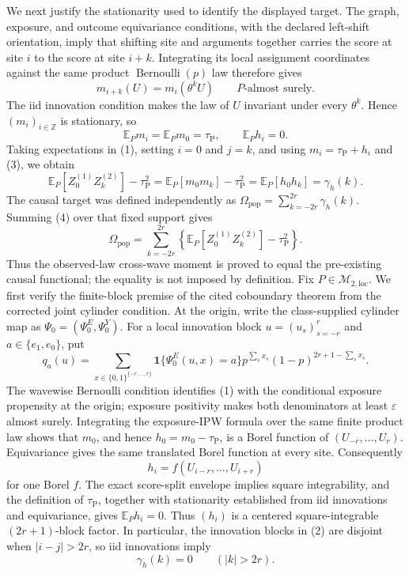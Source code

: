 We next justify the stationarity used to identify the displayed target.  The graph, exposure, and outcome equivariance conditions, with the declared left-shift orientation, imply that shifting site and arguments together carries the score at site \(i\) to the score at site \(i+k\).  Integrating its local assignment coordinates against the same product \(\operatorname{Bernoulli}(p)\) law therefore gives
\[
 m_{i+k}(U)=m_i(\theta^kU)
 \qquad P\text{-almost surely}. \tag{2}
\]
The iid innovation condition makes the law of \(U\) invariant under every \(\theta^k\).  Hence \((m_i)_{i\in\mathbb Z}\) is stationary, so
\[
 \mathbb E_Pm_i=\mathbb E_Pm_0=\tau_{\mathrm P},
 \qquad
 \mathbb E_Ph_i=0. \tag{3}
\]
Taking expectations in (1), setting \(i=0\) and \(j=k\), and using \(m_i=\tau_{\mathrm P}+h_i\) and (3), we obtain
\[
 \mathbb E_P[Z_0^{(1)}Z_k^{(2)}]-\tau_{\mathrm P}^2
 =\mathbb E_P[m_0m_k]-\tau_{\mathrm P}^2
 =\mathbb E_P[h_0h_k]
 =\gamma_h(k). \tag{4}
\]
The causal target was defined independently as \(\Omega_{\mathrm{pop}}=\sum_{k=-2r}^{2r}\gamma_h(k)\).  Summing (4) over that fixed support gives
\[
 \Omega_{\mathrm{pop}}
 =\sum_{k=-2r}^{2r}
 \left\{\mathbb E_P[Z_0^{(1)}Z_k^{(2)}]-\tau_{\mathrm P}^2\right\}.
\]
Thus the observed-law cross-wave moment is proved to equal the pre-existing causal functional; the equality is not imposed by definition.
Fix \(P\in\mathcal M_{2,\mathrm{loc}}\).  We first verify the finite-block premise of the cited coboundary theorem from the corrected joint cylinder condition.  At the origin, write the class-supplied cylinder map as \(\Psi_0=(\Psi_0^E,\Psi_0^Y)\).  For a local innovation block \(u=(u_s)_{s=-r}^r\) and \(a\in\{e_1,e_0\}\), put
\[
 q_a(u)=
 \sum_{x\in\{0,1\}^{\{-r,\ldots,r\}}}
 \mathbf 1\{\Psi_0^E(u,x)=a\}
 p^{\sum_sx_s}(1-p)^{2r+1-\sum_sx_s}. \tag{1}
\]
The wavewise Bernoulli condition identifies (1) with the conditional exposure propensity at the origin; exposure positivity makes both denominators at least \(\varepsilon\) almost surely.  Integrating the exposure-IPW formula over the same finite product law shows that \(m_0\), and hence \(h_0=m_0-\tau_{\mathrm P}\), is a Borel function of \((U_{-r},\ldots,U_r)\).  Equivariance gives the same translated Borel function at every site.  Consequently
\[
 h_i=f(U_{i-r},\ldots,U_{i+r}) \tag{2}
\]
for one Borel \(f\).  The exact score-split envelope implies square integrability, and the definition of \(\tau_{\mathrm P}\), together with stationarity established from iid innovations and equivariance, gives \(\mathbb E_Ph_i=0\).  Thus \((h_i)\) is a centered square-integrable \((2r+1)\)-block factor.  In particular, the innovation blocks in (2) are disjoint when \(|i-j|>2r\), so iid innovations imply
\[
 \gamma_h(k)=0\qquad(|k|>2r). \tag{3}
\]


